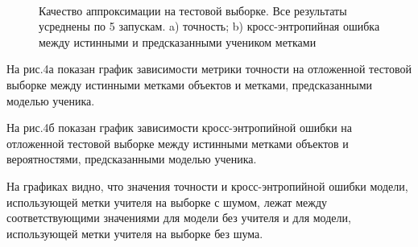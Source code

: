 \begin{figure}[h!t]\center
{}
\\
\caption{Качество аппроксимации на тестовой выборке. Все результаты усреднены по 5 запускам. a) точность; b) кросс-энтропийная ошибка между истинными и предсказанными учеником метками}
\end{figure}

На рис.4а показан график зависимости метрики точности на отложенной тестовой выборке между истинными метками объектов и метками, предсказанными моделью ученика.

На рис.4б показан график зависимости кросс-энтропийной ошибки на отложенной тестовой выборке между истинными метками объектов и вероятностями, предсказанными моделью ученика.

На графиках видно, что значения точности и кросс-энтропийной ошибки модели, использующей метки учителя на выборке с шумом, лежат между соответствующими значениями для модели без учителя и для модели, использующей метки учителя на выборке без шума.

